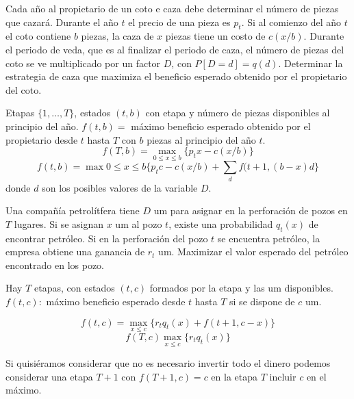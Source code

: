 \documentclass[twoside]{article}
\begin{document}
\newpage 
\begin{ejercicio}{2}
Cada año al propietario de un coto e caza debe determinar el número de piezas que cazará. Durante el año $t$ el precio de una pieza es $p_t$. Si al comienzo del año $t$ el coto contiene $b$ piezas, la caza de $x$ piezas tiene un costo de $c(x/b)$. Durante el periodo de veda, que es al finalizar el periodo de caza, el número de piezas del coto se ve multiplicado por un factor $D$, con $P[D=d]=q(d)$. Determinar la estrategia de caza que maximiza el beneficio esperado obtenido por el propietario del coto.


\begin{solucion}
Etapas $\{1,\dots, T\}$, estados $(t,b)$ con etapa y número de piezas disponibles al principio del año.
$f(t,b)=$ máximo beneficio esperado obtenido por el propietario desde $t$ hasta $T$ con $b$ piezas al principio del año $t$.
$$f(T,b)=\max_{0\leq x\leq b}\{p_tx-c(x/b)\}$$
$$f(t,b)=\max{0\leq x\leq b}\{p_tc-c(x/b)+\sum_d f(t+1,(b-x)d\}$$
donde $d$ son los posibles valores de la variable $D$. 
\end{solucion}

\end{ejercicio}

\newpage 
\begin{ejercicio}{3}
Una compañía petrolítfera tiene $D$ um para asignar en la perforación de pozos en $T$ lugares. Si se asignan $x$ um al pozo $t$, existe una probabilidad $q_t(x)$ de encontrar petróleo. Si en la perforación del pozo $t$ se encuentra petróleo, la empresa obtiene una ganancia de $r_t$ um. Maximizar el valor esperado del petróleo encontrado en los pozo.
\begin{solucion}
Hay $T$ etapas, con estados $(t,c)$ formados por la etapa y las um disponibles. $f(t,c):$ máximo beneficio esperado desde $t$ hasta $T$ si se dispone de $c$ um. 

$$f(t,c)=\max_{x\leq c}\{r_tq_t(x)+f(t+1,c-x)\}$$
$$f(T,c)\max_{x\leq c}\{r_tq_t(x)\}$$

Si quisiéramos considerar que no es necesario invertir todo el dinero podemos considerar una etapa $T+1$ con $f(T+1,c)=c$ en la etapa $T$ incluir $c$ en el máximo. 







\end{solucion}
\end{ejercicio}	
\end{document}
